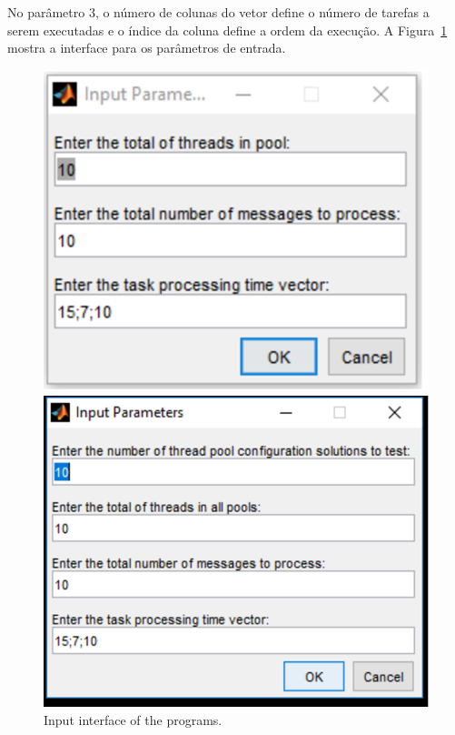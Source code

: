 No parâmetro 3, o número de colunas do vetor define o número de tarefas a serem executadas e o índice da coluna define a ordem da execução. 
A Figura~\ref{fig:inputs} mostra a interface para os parâmetros de entrada.
\begin{figure}[h]
\begin{minipage}[c]{0.49\linewidth}
\centering
 \includegraphics[width=1\linewidth]{./figs/inputs_FIFO.eps}
\end{minipage}
\begin{minipage}[c]{0.49\linewidth}
\centering
\includegraphics[width=1\linewidth]{./figs/inputs.eps}
\end{minipage}
 \caption{Input interface of the programs.}
\label{fig:inputs}
\end{figure}
